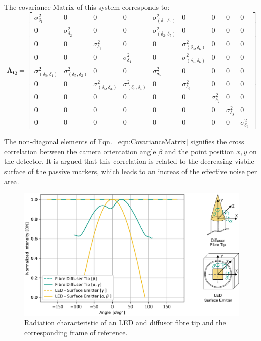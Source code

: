 \documentclass[5p,times,procedia]{elsarticle}
\begin{document}
The covariance Matrix of this system \cite{Liu_2021} corresponds to:
\begin{equation}
	\label{eqn:CovarianceMatrix}
	\mathbf{\Lambda_{Q}} = 
	\begin{bmatrix}
		\sigma_{\delta_1}^2  & 0 & 0 & 0 & \sigma_{(\delta_1,\delta_5)}^2 & 0 & 0 & 0 & 0 \\
		0  & \sigma_{\delta_2}^2 & 0 & 0 & \sigma_{(\delta_2,\delta_5)}^2 & 0 & 0 & 0 & 0 \\
		0 & 0 & \sigma_{\delta_3}^2 & 0 & 0 & \sigma_{(\delta_3,\delta_6)}^2 & 0 & 0 & 0 \\
		0 & 0 & 0 & \sigma_{\delta_4}^2 & 0 & \sigma_{(\delta_4,\delta_6)}^2 & 0 & 0 & 0 \\
		\sigma_{(\delta_5,\delta_1)}^2 & \sigma_{(\delta_5,\delta_2)}^2 & 0 & 0 & \sigma_{\delta_5}^2 & 0 & 0 & 0 & 0 \\
		0 & 0 & \sigma_{(\delta_6,\delta_3)}^2 & \sigma_{(\delta_6,\delta_4)}^2 & 0 & \sigma_{\delta_6}^2 & 0 & 0 & 0 \\
		0 & 0 & 0 & 0 & 0 & 0 & \sigma_{\delta_7}^2 & 0 & 0 \\
		0 & 0 & 0 & 0 & 0 & 0 & 0 & \sigma_{\delta_8}^2 & 0 \\
		0 & 0 & 0 & 0 & 0 & 0 & 0 & 0 & \sigma_{\delta_9}^2
	\end{bmatrix}
\end{equation}

The non-diagonal elements of Eqn.~\ref{eqn:CovarianceMatrix} signifies the cross correlation between the camera orientation angle $\beta$ and the point position $x,y$ on the detector. It is argued \cite{Liu_2021} that this correlation is related to the decreasing visbile surface of the passive markers, which leads to an increas of the effective noise per area.

\begin{figure}[!htb]
	\centering
	\includegraphics[width=0.95\linewidth]{graphics/ScatteringProfile_DiffuseFibreTip.eps}
	\caption{Radiation characteristic of an LED and diffusor fibre tip and the corresponding frame of reference.}
	\label{fig:scat_profile}
\end{figure}
\end{document}

